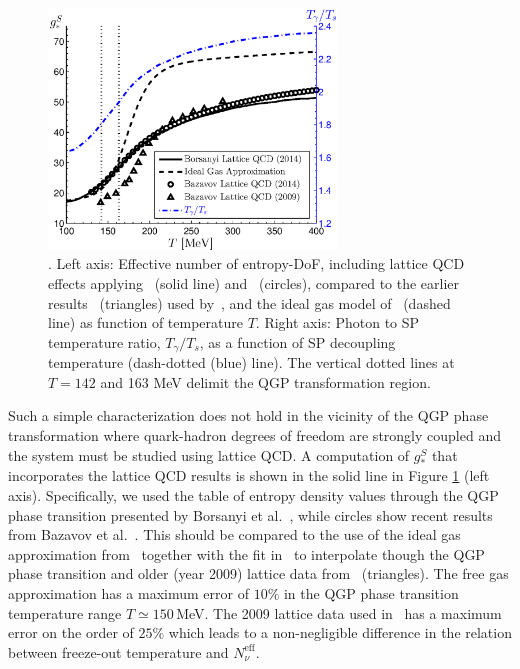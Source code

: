 \begin{figure}\label{fig:gs}
\centering
\begin{minipage}[b]{.49\textwidth}
\centerline{\hspace*{-0.10cm}\includegraphics[height=6.4cm]{04-birrell/ModelIndStudy/Figures/gS_T_ratio.eps}}
\end{minipage}
\caption{. Left axis: Effective number of entropy-DoF, including lattice QCD effects applying~\cite{Borsanyi:2013bia} (solid line) and~\cite{HotQCD:2014kol} (circles), compared to the earlier results~\cite{Bazavov:2009zn} (triangles) used by~\cite{Anchordoqui:2011nh}, and the ideal gas model of~\cite{Coleman:2003hs} (dashed line) as function of temperature $T$. Right axis: Photon to SP temperature ratio, $T_\gamma/T_s$, as a function of SP decoupling temperature (dash-dotted (blue) line). The vertical dotted lines at $T=142$ and 163 MeV delimit the QGP transformation region.\label{fig:gS}}
 \end{figure}

Such a simple characterization does not hold in the vicinity of the QGP phase transformation where  quark-hadron degrees of freedom are strongly coupled  and the system must be studied using lattice QCD. A computation of $g_*^S$ that incorporates the lattice QCD results is shown in the solid line in Figure \ref{fig:gS} (left axis). Specifically, we used the table of entropy density values through the QGP phase transition presented by Borsanyi et al.~\cite{Borsanyi:2013bia}, while circles show recent results from Bazavov et al.~\cite{HotQCD:2014kol}. This should be compared to the use of the ideal gas approximation from~\cite{Coleman:2003hs} together with the fit in~\cite{Wantz:2009it} to interpolate though the QGP phase transition and older (year 2009) lattice data from~\cite{Bazavov:2009zn} (triangles). The free gas approximation has a maximum error of $10\%$ in the QGP phase transition  temperature range  $T\simeq 150$\,MeV.  The 2009 lattice data used in~\cite{Anchordoqui:2011nh} has a maximum error on the order of $25\%$ which leads to a non-negligible difference in the relation between freeze-out temperature and $N^{\text{eff}}_{\nu}$.

